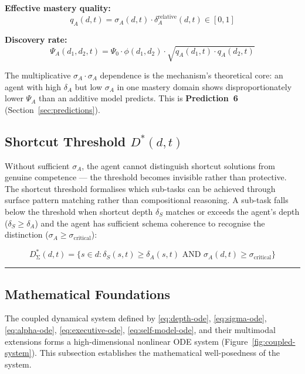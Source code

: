 \documentclass[10pt]{article}
\begin{document}
\textbf{Effective mastery quality:}
\begin{equation}\label{eq:mastery-quality}
q_A(d,t) = \sigma_A(d,t) \cdot \delta_A^{\text{relative}}(d,t) \in [0,1]
\end{equation}

\textbf{Discovery rate:}
\begin{equation}\label{eq:discovery-rate}
\Psi_A(d_1,d_2,t) = \Psi_0 \cdot \phi(d_1,d_2) \cdot \sqrt{q_A(d_1,t) \cdot q_A(d_2,t)}
\end{equation}

The multiplicative $\sigma_A \cdot \sigma_A$ dependence is the
mechanism's theoretical core: an agent with high $\delta_A$ but low
$\sigma_A$ in one mastery domain shows disproportionately lower $\Psi_A$
than an additive model predicts. This is \textbf{Prediction~6}
(Section~\ref{sec:predictions}).

\subsection{Shortcut Threshold \texorpdfstring{$D^*(d,t)$}{D*(d,t)}}\label{sec:shortcut-threshold}

Without sufficient $\sigma_A$, the agent cannot distinguish shortcut solutions from genuine competence --- the threshold becomes invisible rather than protective. The shortcut threshold formalises which sub-tasks can be achieved through surface pattern matching rather than compositional reasoning. A sub-task falls below the threshold when shortcut depth $\delta_S$ matches or exceeds the agent's depth ($\delta_S \geq \delta_A$) and the agent has sufficient schema coherence to recognise the distinction ($\sigma_A \geq \sigma_{\text{critical}}$):

\begin{equation}\label{eq:shortcut-threshold}
D^*_{\text{Σ}}(d,t) = \{s \in d : \delta_S(s,t) \geq \delta_A(s,t) \text{ AND } \sigma_A(d,t) \geq \sigma_{\text{critical}}\}
\end{equation}

\noindent\rule{\linewidth}{0.4pt}

\subsection{Mathematical Foundations}\label{sec:math-foundations}

The coupled dynamical system defined by \eqref{eq:depth-ode},
\eqref{eq:sigma-ode}, \eqref{eq:alpha-ode}, \eqref{eq:executive-ode},
\eqref{eq:self-model-ode}, and their multimodal extensions forms a
high-dimensional nonlinear ODE system (Figure~\ref{fig:coupled-system}). This subsection establishes the
mathematical well-posedness of the system.
\end{document}
